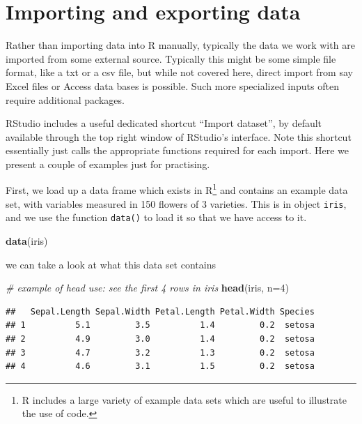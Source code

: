 \documentclass[]{book}
\newenvironment{Shaded}{\begin{snugshade}}{\end{snugshade}}
\newcommand{\KeywordTok}[1]{\textcolor[rgb]{0.13,0.29,0.53}{\textbf{#1}}}
\newcommand{\DataTypeTok}[1]{\textcolor[rgb]{0.13,0.29,0.53}{#1}}
\newcommand{\DecValTok}[1]{\textcolor[rgb]{0.00,0.00,0.81}{#1}}
\newcommand{\CommentTok}[1]{\textcolor[rgb]{0.56,0.35,0.01}{\textit{#1}}}
\newcommand{\NormalTok}[1]{#1}
\let\rmarkdownfootnote\footnote%
\def\footnote{\protect\rmarkdownfootnote}
\theoremstyle{definition}
\theoremstyle{definition}
\theoremstyle{remark}
\begin{document}
\section{Importing and exporting
data}\label{importing-and-exporting-data}

Rather than importing data into R manually, typically the data we work
with are imported from some external source. Typically this might be
some simple file format, like a txt or a csv file, but while not covered
here, direct import from say Excel files or Access data bases is
possible. Such more specialized inputs often require additional
packages.

RStudio includes a useful dedicated shortcut ``Import dataset'', by
default available through the top right window of RStudio's interface.
Note this shortcut essentially just calls the appropriate functions
required for each import. Here we present a couple of examples just for
practising.

First, we load up a data frame which exists in R\footnote{R includes a
  large variety of example data sets which are useful to illustrate the
  use of code.} and contains an example data set, with variables
measured in 150 flowers of 3 varieties. This is in object \texttt{iris},
and we use the function \texttt{data()} to load it so that we have
access to it.

\begin{Shaded}
\begin{Highlighting}[]
\KeywordTok{data}\NormalTok{(iris)}
\end{Highlighting}
\end{Shaded}

we can take a look at what this data set contains

\begin{Shaded}
\begin{Highlighting}[]
\CommentTok{# example of head use: see the first 4 rows in iris}
\KeywordTok{head}\NormalTok{(iris, }\DataTypeTok{n=}\DecValTok{4}\NormalTok{)}
\end{Highlighting}
\end{Shaded}

\begin{verbatim}
##   Sepal.Length Sepal.Width Petal.Length Petal.Width Species
## 1          5.1         3.5          1.4         0.2  setosa
## 2          4.9         3.0          1.4         0.2  setosa
## 3          4.7         3.2          1.3         0.2  setosa
## 4          4.6         3.1          1.5         0.2  setosa
\end{verbatim}
\end{document}
